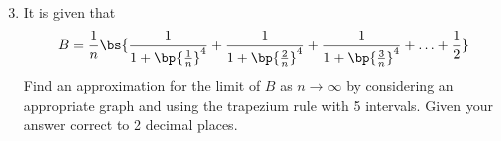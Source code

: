 \begin{problem}
\begin{center}
    \end{center}

    \begin{enumerate}
        \setcounter{enumi}{2}
        \item It is given that \[B = \frac1n \bs{\frac1{1 + \bp{\frac1n}^4} + \frac1{1 + \bp{\frac2n}^4} + \frac1{1 + \bp{\frac3n}^4} + \ldots + \frac12}\] Find an approximation for the limit of $B$ as $n \to \infty$ by considering an appropriate graph and using the trapezium rule with 5 intervals. Given your answer correct to 2 decimal places.
    \end{enumerate}
\end{problem}

